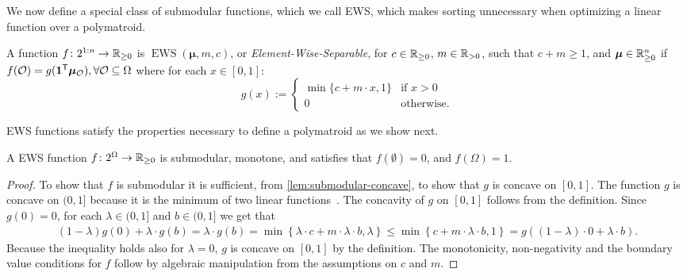 \documentclass[10pt]{article} %
\DeclareMathOperator{\ews}{EWS}
\renewcommand{\cite}{\citep}
\begin{document}
We now define a special class of submodular functions, which we call EWS, which makes sorting unnecessary when optimizing a linear function over a polymatroid.
\begin{definition} \label{asm:submodular-function}
A function $f\colon 2^{1{:}n} \to \mathbb{R}_{\ge 0}$ is $\ews(\bm{\mu} ,m, c)$, or \emph{Element-Wise-Separable}, for $c \in \mathbb{R}_{\ge 0}$,  $m\in \mathbb{R}_{>0}$, such that $c + m \ge 1$, and  $\bm{\mu}\in \mathbb{R}^n_{\ge 0}$ if $f(\mathcal{O}) = g(\bm{1}^{\mathsf{T}} \bm{\mu}_{\mathcal{O}}), \forall \mathcal{O} \subseteq \Omega$ where for each $x \in [0,1]$:
\begin{equation} \label{eq:def-g}
    g(x) :=
    \begin{cases}        
    \min \{c + m  \cdot x, 1\} &\text{if } x > 0 \\
    0 &\text{otherwise}.
    \end{cases}
\end{equation}
\end{definition}
EWS functions satisfy the properties necessary to define a polymatroid as we show next. 
\begin{proposition}
A EWS function $f\colon 2^{\Omega} \to  \mathbb{R}_{\ge 0}$ is submodular, monotone, and satisfies that $f(\emptyset) = 0$, and $f(\Omega) = 1$.   
\end{proposition}
\begin{proof} 
To show that  $f$ is submodular it is sufficient, from \cref{lem:submodular-concave}, to show that $g$ is concave on $[0,1]$. The function $g$ is concave on $(0, 1]$ because it is the minimum of two linear functions~\cite{boyd2004convex}. The concavity of $g$ on $[0, 1]$ follows from the definition. Since $g(0) = 0$, for each $\lambda \in (0,1]$ and $b \in ( 0, 1]$ we get that
\begin{align*}
  (1 - \lambda)g(0) + \lambda \cdot g(b)
  = \lambda \cdot g(b)
  = \min\left\{\lambda  \cdot c + m\cdot \lambda\cdot b, \lambda\right\} 
  \leq \min \left\{ c + m \cdot \lambda \cdot b, 1 \right\}
  = g\left( (1 - \lambda)\cdot 0 + \lambda\cdot b\right).
\end{align*}
Because the inequality holds also for $\lambda = 0$, $g$ is concave on $[0,1]$ by the definition. The monotonicity, non-negativity and the boundary value conditions for $f$ follow by algebraic manipulation from the assumptions on $c$ and
$m$. 
\end{proof}
\end{document}
